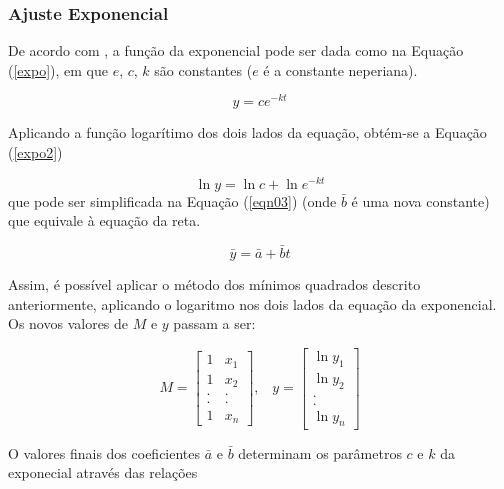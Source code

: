 {	\subsubsection{Ajuste Exponencial}

	De acordo com \cite{calculo}, a função da exponencial pode ser dada como na Equação (\ref{expo}), em que $e$, $c$, $k$ são constantes ($e$ é a constante neperiana).  

	\begin{equation}
	\label{expo}
		y = ce^{-kt}
	\end{equation}

	Aplicando a função logarítimo dos dois lados da equação, obtém-se a  Equação (\ref{expo2})

	\begin{equation}
	\label{expo2}
		\ln{y} = \ln{c}  + \ln{e^{-kt}}
	\end{equation}
 	que pode ser simplificada na  Equação (\ref{eqn03}) (onde $\bar{b}$ é uma nova constante) que equivale à equação da reta. 

	\begin{equation}
	\label{eqn03}
		\bar{y} = \bar{a} + \bar{b}t
	\end{equation}	

	Assim, é possível aplicar o método dos mínimos quadrados descrito anteriormente, aplicando o logaritmo nos dois lados da equação da exponencial. Os novos valores de $M$ e $y$ passam a ser: 

	\begin{equation}
	M = \left[\begin{array}{cc}
               	1 &  x_{1} \\
               	1 & x_{2}  \\
		. & .  \\
               	. & .  \\
		1 & x_{n}
          	         \end{array}\right] \mbox{,} \quad
	y = \left[\begin{array}{c}
               	\ln{y_{1}} \\
               	\ln{y_{2}}  \\
		.   \\
               	.   \\
		\ln{y_{n}}
          	         \end{array}\right] 
	\label{nvar}
	\end{equation}

	O valores finais dos coeficientes $\bar{a}$ e $\bar{b}$ determinam os parâmetros $c$ e $k$ da exponecial através das relações

}
